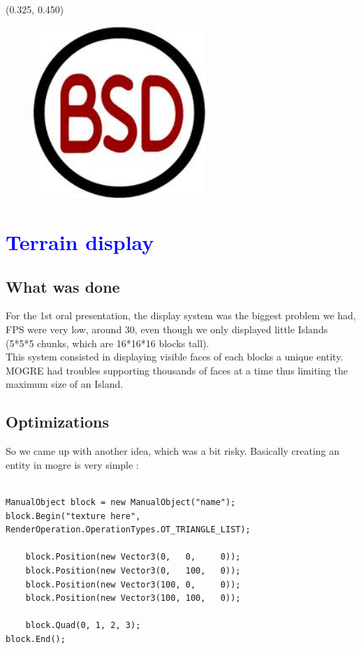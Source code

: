 \documentclass[article]{report}             %
\begin{document}
				\begin{textblock}{0.628}(0.325, 0.450)
					\begin{figure}
						\includegraphics[width=6.5cm]{images/BSD.jpeg}
					\end{figure}
				\end{textblock}
		

		\chapter{\textcolor{blue}{Terrain display}}
			\section{What was done}
				For the 1st oral presentation, the display system was the biggest problem we had, FPS were very low, around 30, even though we only displayed little Islands (5*5*5 chunks, which are 16*16*16 blocks tall).\\

This system consisted in displaying visible faces of each blocks a unique entity. MOGRE had troubles supporting thousands of faces at a time thus limiting the maximum size of an Island.

			\section{Optimizations}
				So we came up with another idea, which was a bit risky. Basically creating an entity in mogre is very simple :\\
\begin{lstlisting}

ManualObject block = new ManualObject("name");
block.Begin("texture here", RenderOperation.OperationTypes.OT_TRIANGLE_LIST);

	block.Position(new Vector3(0,   0,     0));
	block.Position(new Vector3(0,   100,   0));
	block.Position(new Vector3(100, 0,     0));
	block.Position(new Vector3(100, 100,   0));

	block.Quad(0, 1, 2, 3);
block.End();

\end{lstlisting}
\end{document}
